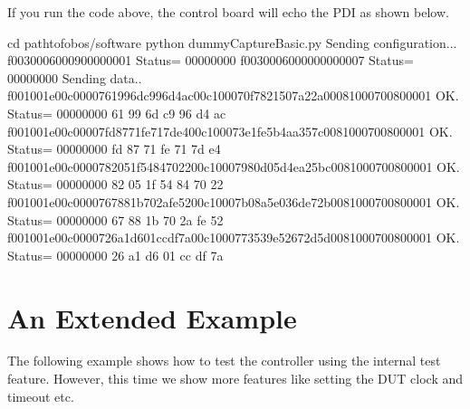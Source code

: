 \documentclass[letterpaper,10pt,english]{sphinxmanual}
\begin{document}
\begin{sphinxVerbatim}[commandchars=\\\{\},numbers=left,firstnumber=1,stepnumber=1]
  
   
    
       \PYG{p}{[}\PYG{p}{]}
         
        
          
       
\end{sphinxVerbatim}

If you run the code above, the control board will echo the PDI as shown below.

\begin{sphinxVerbatim}[commandchars=\\\{\}]
\PYGZdl{} cd path\PYGZhy{}to\PYGZhy{}fobos/software
\PYGZdl{} python dummyCaptureBasic.py
Sending configuration...
f0030006000900000001
Status= 00000000
f0030006000000000007
Status= 00000000
Sending data..
f001001e00c0000761996dc996d4ac00c100070f7821507a22a00081000700800001
OK.    Status= 00000000
61 99 6d c9 96 d4 ac
f001001e00c00007fd8771fe717de400c100073e1fe5b4aa357c0081000700800001
OK.    Status= 00000000
fd 87 71 fe 71 7d e4
f001001e00c0000782051f5484702200c10007980d05d4ea25bc0081000700800001
OK.    Status= 00000000
82 05 1f 54 84 70 22
f001001e00c0000767881b702afe5200c10007b08a5e036de72b0081000700800001
OK.    Status= 00000000
67 88 1b 70 2a fe 52
f001001e00c0000726a1d601ccdf7a00c1000773539e52672d5d0081000700800001
OK.    Status= 00000000
26 a1 d6 01 cc df 7a
\end{sphinxVerbatim}


\section{An Extended Example}
\label{\detokenize{capture_data:an-extended-example}}
The following example shows how to test the controller using the internal test feature. However, this time
we show more features like setting the DUT clock and timeout etc.
\end{document}
